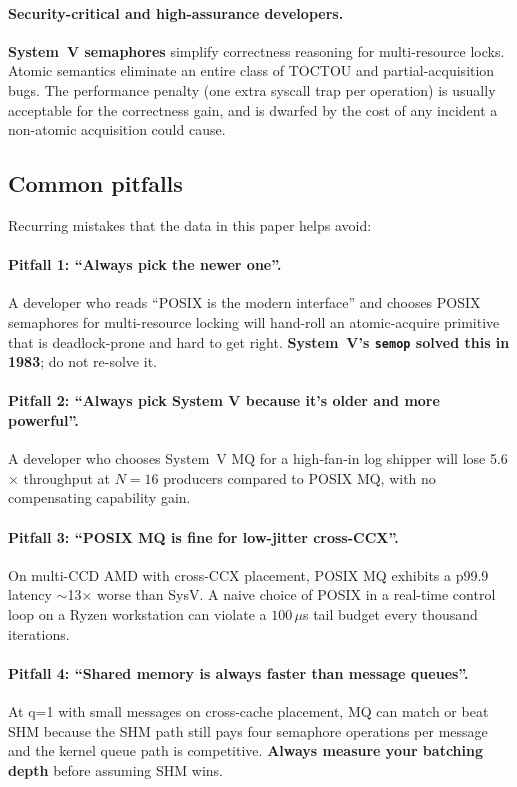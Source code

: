 \documentclass[a4paper,11pt]{article}
\begin{document}
\paragraph{Security-critical and high-assurance developers.}
\textbf{System~V semaphores} simplify correctness reasoning for
multi-resource locks. Atomic semantics eliminate an entire class of
TOCTOU and partial-acquisition bugs. The performance penalty (one
extra syscall trap per operation) is usually acceptable for the
correctness gain, and is dwarfed by the cost of any incident a
non-atomic acquisition could cause.

\subsection{Common pitfalls}
\label{sec:guidance:pitfalls}

Recurring mistakes that the data in this paper helps avoid:

\paragraph{Pitfall 1: ``Always pick the newer one''.}
A developer who reads ``POSIX is the modern interface'' and chooses
POSIX semaphores for multi-resource locking will hand-roll an
atomic-acquire primitive that is deadlock-prone and hard to get
right. \textbf{System~V's \texttt{semop} solved this in 1983}; do
not re-solve it.

\paragraph{Pitfall 2: ``Always pick System V because it's
older and more powerful''.}
A developer who chooses System~V MQ for a high-fan-in log shipper
will lose 5.6$\times$ throughput at $N=16$ producers compared to
POSIX MQ, with no compensating capability gain.

\paragraph{Pitfall 3: ``POSIX MQ is fine for low-jitter
cross-CCX''.}
On multi-CCD AMD with cross-CCX placement, POSIX MQ exhibits a
p99.9 latency $\sim$13$\times$ worse than SysV. A naive choice of
POSIX in a real-time control loop on a Ryzen workstation can
violate a $100\,\mu$s tail budget every thousand iterations.

\paragraph{Pitfall 4: ``Shared memory is always faster than
message queues''.}
At q=1 with small messages on cross-cache placement, MQ can match
or beat SHM because the SHM path still pays four semaphore
operations per message and the kernel queue path is competitive.
\textbf{Always measure your batching depth} before assuming SHM
wins.
\end{document}
